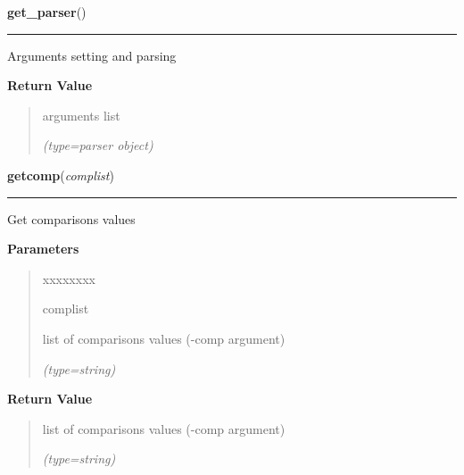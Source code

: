     \label{EveryGO:get_parser}

    \vspace{0.5ex}

\hspace{.8\funcindent}\begin{boxedminipage}{\funcwidth}

    \raggedright \textbf{get\_parser}()

    \vspace{-1.5ex}

    \rule{\textwidth}{0.5\fboxrule}
\setlength{\parskip}{2ex}
    Arguments setting and parsing

\setlength{\parskip}{1ex}
      \textbf{Return Value}
    \vspace{-1ex}

      \begin{quote}
      arguments list

      {\it (type=parser object)}

      \end{quote}

    \end{boxedminipage}

    \label{EveryGO:getcomp}

    \vspace{0.5ex}

\hspace{.8\funcindent}\begin{boxedminipage}{\funcwidth}

    \raggedright \textbf{getcomp}(\textit{complist})

    \vspace{-1.5ex}

    \rule{\textwidth}{0.5\fboxrule}
\setlength{\parskip}{2ex}
    Get comparisons values

\setlength{\parskip}{1ex}
      \textbf{Parameters}
      \vspace{-1ex}

      \begin{quote}
        \begin{Ventry}{xxxxxxxx}

          \item[complist]

          list of comparisons values (-comp argument)

            {\it (type=string)}

        \end{Ventry}

      \end{quote}

      \textbf{Return Value}
    \vspace{-1ex}

      \begin{quote}
      list of comparisons values (-comp argument)

      {\it (type=string)}

      \end{quote}

    \end{boxedminipage}

